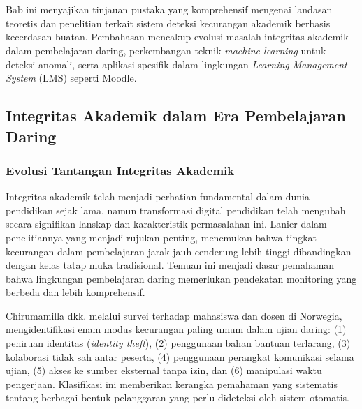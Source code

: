 \chapter{\babDua}
\label{bab:2}

Bab ini menyajikan tinjauan pustaka yang komprehensif mengenai landasan teoretis dan penelitian terkait sistem deteksi kecurangan akademik berbasis kecerdasan buatan. Pembahasan mencakup evolusi masalah integritas akademik dalam pembelajaran daring, perkembangan teknik \textit{machine learning} untuk deteksi anomali, serta aplikasi spesifik dalam lingkungan \textit{Learning Management System} (LMS) seperti Moodle.

\section{Integritas Akademik dalam Era Pembelajaran Daring}
\label{sec:integritasAkademik}

\subsection{Evolusi Tantangan Integritas Akademik}
\label{subsec:evolusiTantangan}

Integritas akademik telah menjadi perhatian fundamental dalam dunia pendidikan sejak lama, namun transformasi digital pendidikan telah mengubah secara signifikan lanskap dan karakteristik permasalahan ini. Lanier \cite{Lanier2006} dalam penelitiannya yang menjadi rujukan penting, menemukan bahwa tingkat kecurangan dalam pembelajaran jarak jauh cenderung lebih tinggi dibandingkan dengan kelas tatap muka tradisional. Temuan ini menjadi dasar pemahaman bahwa lingkungan pembelajaran daring memerlukan pendekatan monitoring yang berbeda dan lebih komprehensif.

Chirumamilla dkk. \cite{Chirumamilla2020} melalui survei terhadap mahasiswa dan dosen di Norwegia, mengidentifikasi enam modus kecurangan paling umum dalam ujian daring: (1) peniruan identitas (\textit{identity theft}), (2) penggunaan bahan bantuan terlarang, (3) kolaborasi tidak sah antar peserta, (4) penggunaan perangkat komunikasi selama ujian, (5) akses ke sumber eksternal tanpa izin, dan (6) manipulasi waktu pengerjaan. Klasifikasi ini memberikan kerangka pemahaman yang sistematis tentang berbagai bentuk pelanggaran yang perlu dideteksi oleh sistem otomatis.

